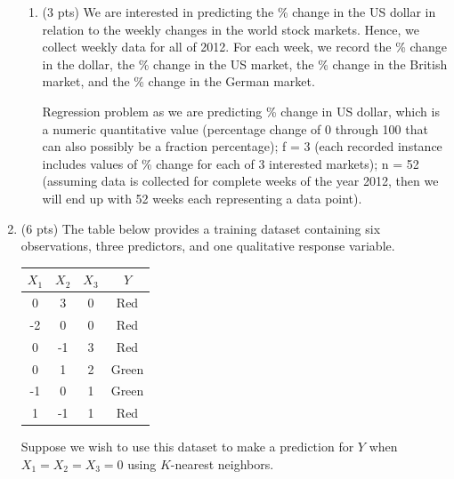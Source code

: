 \documentclass[a4paper]{article}
\theoremstyle{definition}
\newenvironment{soln}{
    \leavevmode\color{blue}\ignorespaces
}{}
\begin{document}
\begin{enumerate}
\begin{enumerate}
          \item (3 pts) We are interested in predicting the \% change in the US dollar in relation to the weekly changes in the world stock markets. Hence, we collect weekly data for all of 2012. For each week, we record the \% change in the dollar, the \% change in the US market, the \% change in the British market, and the \% change in the German market.

                \begin{soln}  Regression problem as we are predicting \% change in US dollar, which is a numeric quantitative value (percentage change of 0 through 100 that can also possibly be a fraction percentage); f = 3 (each recorded instance includes values of \% change for each of 3 interested markets); n = 52 (assuming data is collected for complete weeks of the year 2012, then we will end up with 52 weeks each representing a data point). \end{soln}


        \end{enumerate}

  \item (6 pts) The table below provides a training dataset containing six observations, three predictors, and one qualitative response variable.

        \begin{center}
          \begin{tabular}{ c  c  c  c}
            \hline
            $X_{1}$ & $X_{2}$ & $X_{3}$ & $Y$   \\ \hline
            0       & 3       & 0       & Red   \\
            -2      & 0       & 0       & Red   \\
            0       & -1      & 3       & Red   \\
            0       & 1       & 2       & Green \\
            -1      & 0       & 1       & Green \\
            1       & -1      & 1       & Red   \\
            \hline
          \end{tabular}
        \end{center}

        Suppose we wish to use this dataset to make a prediction for $Y$ when $X_{1} = X_{2} = X_{3} = 0$ using $K$-nearest neighbors.


\end{enumerate}
\end{document}
